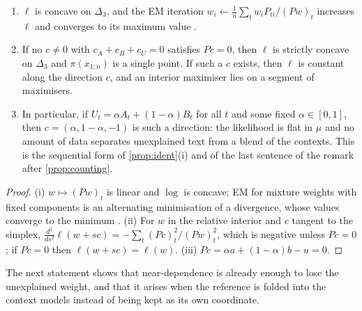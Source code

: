 \begin{proposition}\label{prop:sample-ident}
\leavevmode
\begin{enumerate}[label=(\roman*)]
\item $\ell$ is concave on $\Delta_3$, and the EM iteration
  $w_i\leftarrow\frac1n\sum_tw_iP_{ti}/(Pw)_t$ increases $\ell$ and converges to its maximum value
  \cite{DempsterLairdRubin1977,CsiszarTusnady1984}.
\item If no $c\ne0$ with $c_A+c_B+c_U=0$ satisfies $Pc=0$, then $\ell$ is strictly concave on
  $\Delta_3$ and $\pi(x_{1:n})$ is a single point. If such a $c$ exists, then $\ell$ is constant along
  the direction $c$, and an interior maximiser lies on a segment of maximisers.
\item In particular, if $U_t=\alpha A_t+(1-\alpha)B_t$ for all $t$ and some fixed $\alpha\in[0,1]$, then
  $c=(\alpha,1-\alpha,-1)$ is such a direction: the likelihood is flat in $\mu$ and no amount of data
  separates unexplained text from a blend of the contexts. This is the sequential form of
  \cref{prop:ident}(i) and of the last sentence of the remark after \cref{prop:counting}.
\end{enumerate}
\end{proposition}
\begin{proof}
(i) $w\mapsto(Pw)_t$ is linear and $\log$ is concave; EM for mixture weights with fixed components
is an alternating minimisation of a divergence, whose values converge to the minimum
\cite{CsiszarTusnady1984}. (ii) For $w$ in the relative interior and $c$ tangent to the simplex,
$\frac{d^2}{ds^2}\ell(w+sc)=-\sum_t(Pc)_t^2/(Pw)_t^2$, which is negative unless $Pc=0$; if $Pc=0$
then $\ell(w+sc)=\ell(w)$. (iii) $Pc=\alpha a+(1-\alpha)b-u=0$.
\end{proof}

The next statement shows that near-dependence is already enough to lose the unexplained weight,
and that it arises when the reference is folded into the context models instead of being kept as
its own coordinate.


